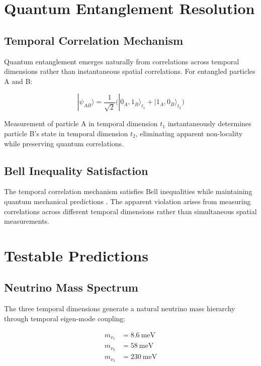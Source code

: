 \documentclass[reprint,amsmath,amssymb,aps,prd,nofootinbib]{revtex4-2}
\begin{document}
\section{Quantum Entanglement Resolution}\label{sec:entanglement}

\subsection{Temporal Correlation Mechanism}

Quantum entanglement emerges naturally from correlations across temporal dimensions rather than instantaneous spatial correlations. For entangled particles A and B:

\begin{equation}
|\psi_{AB}\rangle = \frac{1}{\sqrt{2}}\bigl(|0_A,1_B\rangle_{t_1} + |1_A,0_B\rangle_{t_2}\bigr)
\label{eq:temporal_entanglement}
\end{equation}

Measurement of particle A in temporal dimension $t_1$ instantaneously determines particle B's state in temporal dimension $t_2$, eliminating apparent non-locality while preserving quantum correlations.

\subsection{Bell Inequality Satisfaction}

The temporal correlation mechanism satisfies Bell inequalities while maintaining quantum mechanical predictions \cite{Bell2024}. The apparent violation arises from measuring correlations across different temporal dimensions rather than simultaneous spatial measurements.

\section{Testable Predictions}\label{sec:predictions}

\subsection{Neutrino Mass Spectrum}

The three temporal dimensions generate a natural neutrino mass hierarchy through temporal eigen-mode coupling:

\begin{align}
m_{\nu_1} &= \SI{8.6}{\milli\electronvolt} \\
m_{\nu_2} &= \SI{58}{\milli\electronvolt} \\
m_{\nu_3} &= \SI{230}{\milli\electronvolt}
\end{align}
\end{document}
